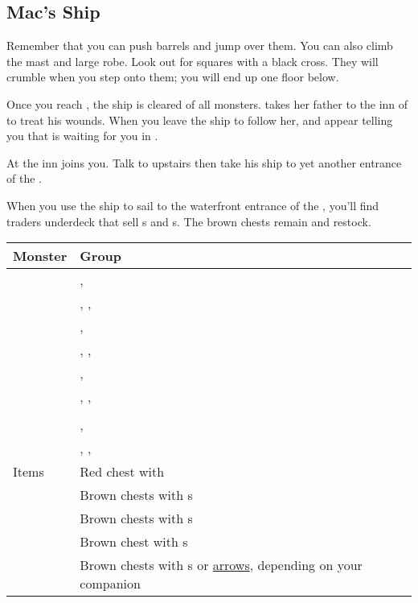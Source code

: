 \subsection{Mac's Ship}
\label{map:macs_ship}

Remember that you can push barrels and jump over them. You can also climb the mast and large robe. Look out for squares with a black cross. They will crumble when you step onto them; you will end up one floor below.

Once you reach , the ship is cleared of all monsters.  takes her father to the inn of  to treat his wounds. When you leave the ship to follow her,  and  appear telling you that  is waiting for you in .

At the inn  joins you. Talk to  upstairs then take his ship to yet another entrance of the .

\bigskip

When you use the ship to sail to the waterfront entrance of the , you'll find traders underdeck that sell s and s. The brown chests remain and restock.


\noindent\begin{tabularx}{\textwidth}[l]{lX}
	Monster & Group
\\ \hline
	\nameref{monster:naga}
	& \nameref{monster:naga}, \nameref{monster:naga} \\
	& \nameref{monster:naga}, \nameref{monster:naga}, \nameref{monster:naga}
\\ \hline
	\nameref{monster:thanatos}
	& \nameref{monster:thanatos}, \nameref{monster:thanatos} \\
	& \nameref{monster:thanatos}, \nameref{monster:manticor}, \nameref{monster:beholder}
\\ \hline
	\nameref{monster:gargoyle}
	& \nameref{monster:gargoyle}, \nameref{monster:gargoyle} \\
	& \nameref{monster:gargoyle}, \nameref{monster:gargoyle}, \nameref{monster:gargoyle}
\\ \hline
	\nameref{monster:chimera}
	& \nameref{monster:chimera} \\
	& \nameref{monster:chimera}, \nameref{monster:sorcerer} \\
	& \nameref{monster:chimera}, \nameref{monster:sorcerer}, \nameref{monster:sorcerer}
\\ \hline
	Items
	& Red chest with \nameref{armor:aegis_shield} \\
	& Brown chests with \nameref{item:cure_potion}s \\
	& Brown chests with \nameref{item:heal_potion}s \\
	& Brown chest with \nameref{item:refresher}s \\
	& Brown chests with \nameref{weapon:bomb}s or \hyperref[weapon:bow_of_grace]{arrows}, depending on your companion
\end{tabularx}
